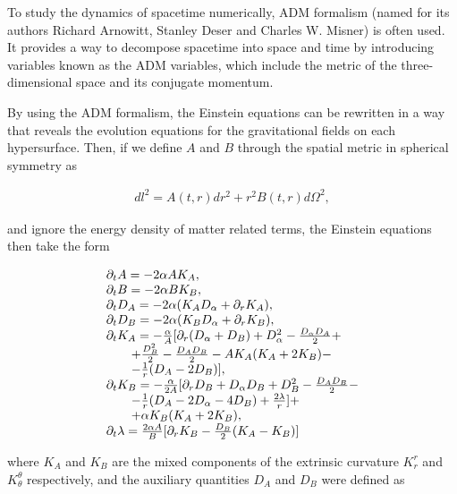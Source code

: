 To study the dynamics of spacetime numerically, ADM formalism (named for its authors Richard Arnowitt, Stanley Deser and Charles W. Misner) is often used. It provides a way to decompose spacetime into space and time by introducing variables known as the ADM variables, which include the metric of the three-dimensional space and its conjugate momentum.

By using the ADM formalism, the Einstein equations can be rewritten in a way that reveals the evolution equations for the gravitational fields on each hypersurface. Then, if we define $A$ and $B$ through the spatial metric in spherical symmetry as

\begin{align}
    dl^2 = A(t,r)dr^2 + r^2B(t,r) d\Omega^2,
    \label{eq:metric}
\end{align}

\noindent
and ignore the energy density of matter related terms, the Einstein equations then take the form \cite{book}

\begin{align}
    \begin{array}{@{}l@{}}
        \partial_t A = -2 \alpha A K_A,
        \\
        \partial_t B = -2 \alpha B K_B,
        \\
        \partial_t D_A = -2\alpha (K_A D_\alpha + \partial_r K_A),
        \\
        \partial_t D_B = -2\alpha (K_B D_\alpha + \partial_r K_B),
        \\
        \partial_t K_A = -\frac{\alpha}{A} [ \partial_r(D_\alpha + D_B) + D_\alpha^2 - \frac{D_\alpha D_A}{2} +\\ \qquad+ \frac{D_B^2}{2} - \frac{D_A D_B}{2} - A K_A(K_A + 2 K_B) -\\ \qquad- \frac{1}{r}(D_A - 2 D_B) ],
        \\
        \partial_t K_B = -\frac{\alpha}{2A} [ \partial_r D_B + D_\alpha D_B + D_B^2 - \frac{D_A D_B}{2} -\\ \qquad- \frac{1}{r}(D_A - 2 D_\alpha - 4 D_B) + \frac{2 \lambda}{r} ] +\\ \qquad + \alpha K_B(K_A + 2K_B),
        \\
        \partial_t \lambda = \frac{2 \alpha A}{B} [ \partial_r K_B - \frac{D_B}{2}(K_A - K_B) ]
    \end{array} 
    \label{eq:ADM}
\end{align}

\noindent
where $K_A$ and $K_B$ are the mixed components of the extrinsic curvature $K_r^r$ and $K^\theta_\theta$ respectively, and the auxiliary quantities $D_A$ and $D_B$ were defined as 


